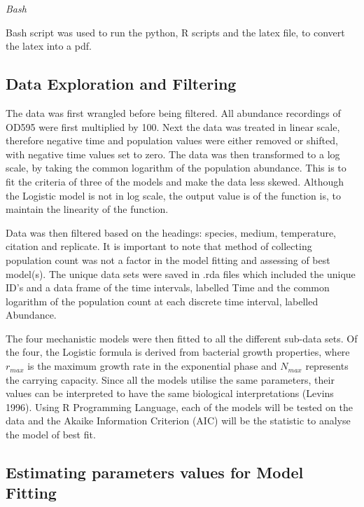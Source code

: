 \documentclass[11pt]{article}
\begin{document}
\textit{Bash}

Bash script was used to run the python, R scripts and the latex file, to convert the latex into a pdf.

\subsection{Data Exploration and Filtering}

The data was first wrangled before being filtered. All abundance recordings of OD595 were first multiplied by 100. Next the data was treated in linear scale, therefore negative time and population values were either removed or shifted, with negative time values set to zero. The data was then transformed to a log scale, by taking the common logarithm of the population abundance. This is to fit the criteria of three of the models and make the data less skewed. Although the Logistic model is not in log scale, the output value is of the function is, to maintain the linearity of the function.

Data was then filtered based on the headings: species, medium, temperature, citation and replicate. It is important to note that method of collecting population count was not a factor in the model fitting and assessing of best model(s). The unique data sets were saved in .rda files which included the unique ID’s and a data frame of the time intervals, labelled Time and the common logarithm of the population count at each discrete time interval, labelled Abundance.

The four mechanistic models were then fitted to all the different sub-data sets. Of the four, the Logistic formula is derived from bacterial growth properties, where $r_{max}$ is the maximum growth rate in the exponential phase and $N_{max}$ represents the carrying capacity. Since all the models utilise the same parameters, their values can be interpreted to have the same biological interpretations (Levins 1996). Using R Programming Language, each of the models will be tested on the data and the Akaike Information Criterion (AIC) will be the statistic to analyse the model of best fit.

\subsection{Estimating parameters values for Model Fitting}
\end{document}

